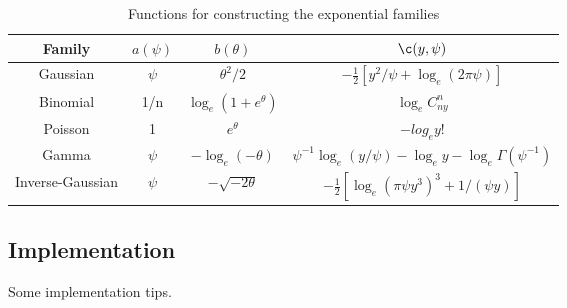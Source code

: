 \begin{table}[h]
\centering
\begin{tabular}{cccc}
Family & $a(\psi)$ & $b(\theta)$ & $\c(y, \psi)$ \\
\hline
Gaussian & $\psi$ & $\theta^2/2$ & $-\frac{1}{2}\left[y^2/\psi+\log_e(2\pi\psi)\right]$ \\
Binomial & 1/n & $\log_e(1+e^\theta)$ & $\log_eC^n_{ny}$ \\
Poisson & 1 & $e^\theta$ & $-log_ey!$ \\
Gamma & $\psi$ & $-\log_e(-\theta)$ & $\psi^{-1}\log_e(y/\psi) - \log_ey - \log_e\Gamma(\psi^{-1})$ \\
Inverse-Gaussian & $\psi$ & $-\sqrt{-2\theta}$ & $-\frac{1}{2}\left[\log_e(\pi\psi y^3)^3 + 1/(\psi y) \right]$ \\
\end{tabular}
\caption{Functions for constructing the exponential families}
\label{tab:glm_func}
\end{table}

\subsection{Implementation}
Some implementation tips.


